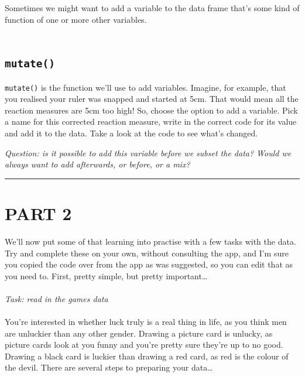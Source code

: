 \documentclass[
]{book}
\begin{document}
Sometimes we might want to add a variable to the data frame that's some kind of
function of one or more other variables.\\
~\\

\hypertarget{mutate}{%
\subsection{\texorpdfstring{\texttt{mutate()}}{mutate()}}\label{mutate}}

\texttt{mutate()} is the function we'll use to add variables. Imagine, for example,
that you realised your ruler was snapped and started at 5cm. That would mean all
the reaction measures are 5cm too high! So, choose the option to add a variable.
Pick a name for this corrected reaction measure, write in the correct code for its
value and add it to the data. Take a look at the code to see what's changed.

\emph{Question: is it possible to add this variable before we subset the data? Would
we always want to add afterwards, or before, or a mix?}\\

\begin{center}\rule{0.5\linewidth}{0.5pt}\end{center}

\hypertarget{part-2}{%
\section{PART 2}\label{part-2}}

We'll now put some of that learning into practise with a few tasks with the
data. Try and complete these on your own, without consulting the app, and
I'm sure you copied the code over from the app as was suggested, so you can
edit that as you need to. First, pretty simple, but pretty important\ldots{}\\
~\\

\emph{Task: read in the games data}\\
~\\

You're interested in whether luck truly is a real thing in life, as you think
men are unluckier than any other gender. Drawing a picture card is unlucky, as
picture cards look at you funny and you're pretty sure they're up to no good.
Drawing a black card is luckier than drawing a red card, as red is the colour
of the devil. There are several steps to preparing your data\ldots{}
\end{document}
